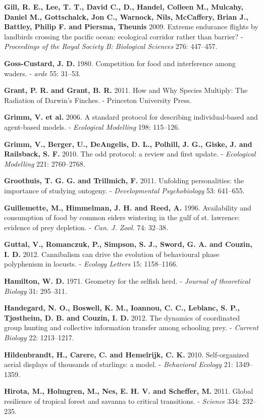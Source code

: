 \documentclass[]{scrartcl}
\begin{document}
\begin{multicols}{2}
\textbf{Gill, R. E., Lee, T. T., David C., D., Handel, Colleen M.,
Mulcahy, Daniel M., Gottschalck, Jon C., Warnock, Nils, McCaffery, Brian
J., Battley, Philip F. and Piersma, Theunis} 2009. Extreme endurance
flights by landbirds crossing the pacific ocean: ecological corridor
rather than barrier? - \emph{Proceedings of the Royal Society B:
Biological Sciences} 276: 447--457.

\textbf{Goss-Custard, J. D.} 1980. Competition for food and interference
among waders. - \emph{arde} 55: 31--53.

\textbf{Grant, P. R. and Grant, B. R.} 2011. How and Why Species
Multiply: The Radiation of Darwin's Finches. - Princeton University
Press.

\textbf{Grimm, V. et al.} 2006. A standard protocol for describing
individual-based and agent-based models. - \emph{Ecological Modelling}
198: 115--126.

\textbf{Grimm, V., Berger, U., DeAngelis, D. L., Polhill, J. G., Giske,
J. and Railsback, S. F.} 2010. The odd protocol: a review and first
update. - \emph{Ecological Modelling} 221: 2760--2768.

\textbf{Groothuis, T. G. G. and Trillmich, F.} 2011. Unfolding
personalities: the importance of studying ontogeny. -
\emph{Developmental Psychobiology} 53: 641--655.

\textbf{Guillemette, M., Himmelman, J. H. and Reed, A.} 1996.
Availability and consumption of food by common eiders wintering in the
gulf of st. lawrence: evidence of prey depletion. - \emph{Can. J. Zool.}
74: 32--38.

\textbf{Guttal, V., Romanczuk, P., Simpson, S. J., Sword, G. A. and
Couzin, I. D.} 2012. Cannibalism can drive the evolution of behavioural
phase polyphenism in locusts. - \emph{Ecology Letters} 15: 1158--1166.

\textbf{Hamilton, W. D.} 1971. Geometry for the selfish herd. -
\emph{Journal of theoretical Biology} 31: 295--311.

\textbf{Handegard, N. O., Boswell, K. M., Ioannou, C. C., Leblanc, S.
P., Tjøstheim, D. B. and Couzin, I. D.} 2012. The dynamics of
coordinated group hunting and collective information transfer among
schooling prey. - \emph{Current Biology} 22: 1213--1217.

\textbf{Hildenbrandt, H., Carere, C. and Hemelrijk, C. K.} 2010.
Self-organized aerial displays of thousands of starlings: a model. -
\emph{Behavioral Ecology} 21: 1349--1359.

\textbf{Hirota, M., Holmgren, M., Nes, E. H. V. and Scheffer, M.} 2011.
Global resilience of tropical forest and savanna to critical
transitions. - \emph{Science} 334: 232--235.


\end{multicols}
\end{document}
